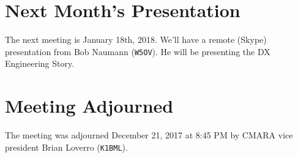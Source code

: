 \documentclass[10pt,letterpaper]{article}
\begin{document}
\section{Next Month's Presentation}
The next meeting is January 18th, 2018. We'll have a remote (Skype) presentation from Bob Naumann (\texttt{W5OV}).  He will be presenting the DX Engineering Story.

\section{Meeting Adjourned}
The meeting was adjourned December 21, 2017 at 8:45 PM by CMARA vice president Brian Loverro (\texttt{K1BML}).
\end{document}
